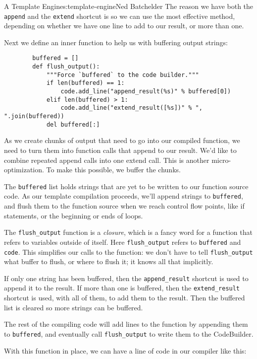 \begin{aosachapter}{A Template Engine}{s:template-engine}{Ned Batchelder}
The reason we have both the \texttt{append} and the \texttt{extend}
shortcut is so we can use the most effective method, depending on
whether we have one line to add to our result, or more than one.

Next we define an inner function to help us with buffering output
strings:

\begin{verbatim}
        buffered = []
        def flush_output():
            """Force `buffered` to the code builder."""
            if len(buffered) == 1:
                code.add_line("append_result(%s)" % buffered[0])
            elif len(buffered) > 1:
                code.add_line("extend_result([%s])" % ", ".join(buffered))
            del buffered[:]
\end{verbatim}

As we create chunks of output that need to go into our compiled
function, we need to turn them into function calls that append to our
result. We'd like to combine repeated append calls into one extend call.
This is another micro-optimization. To make this possible, we buffer the
chunks.

The \texttt{buffered} list holds strings that are yet to be written to
our function source code. As our template compilation proceeds, we'll
append strings to \texttt{buffered}, and flush them to the function
source when we reach control flow points, like if statements, or the
beginning or ends of loops.

The \texttt{flush\_output} function is a \emph{closure}, which is a
fancy word for a function that refers to variables outside of itself.
Here \texttt{flush\_output} refers to \texttt{buffered} and
\texttt{code}. This simplifies our calls to the function: we don't have
to tell \texttt{flush\_output} what buffer to flush, or where to flush
it; it knows all that implicitly.

If only one string has been buffered, then the \texttt{append\_result}
shortcut is used to append it to the result. If more than one is
buffered, then the \texttt{extend\_result} shortcut is used, with all of
them, to add them to the result. Then the buffered list is cleared so
more strings can be buffered.

The rest of the compiling code will add lines to the function by
appending them to \texttt{buffered}, and eventually call
\texttt{flush\_output} to write them to the CodeBuilder.

With this function in place, we can have a line of code in our compiler
like this:


\end{aosachapter}
